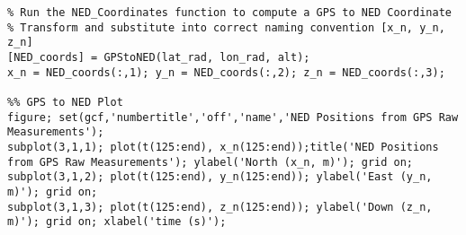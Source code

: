 \begin{lstlisting}
% Run the NED_Coordinates function to compute a GPS to NED Coordinate
% Transform and substitute into correct naming convention [x_n, y_n, z_n]
[NED_coords] = GPStoNED(lat_rad, lon_rad, alt);
x_n = NED_coords(:,1); y_n = NED_coords(:,2); z_n = NED_coords(:,3);

%% GPS to NED Plot
figure; set(gcf,'numbertitle','off','name','NED Positions from GPS Raw Measurements');  
subplot(3,1,1); plot(t(125:end), x_n(125:end));title('NED Positions from GPS Raw Measurements'); ylabel('North (x_n, m)'); grid on;
subplot(3,1,2); plot(t(125:end), y_n(125:end)); ylabel('East (y_n, m)'); grid on;
subplot(3,1,3); plot(t(125:end), z_n(125:end)); ylabel('Down (z_n, m)'); grid on; xlabel('time (s)');
\end{lstlisting}
\label{fig:GPS2NEDMatlab}
